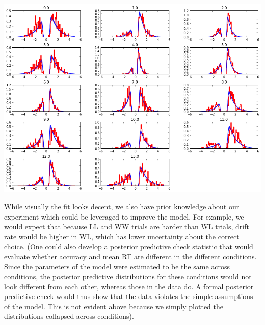 \documentclass[letterpaper,10pt,english]{sphinxmanual}
\begin{document}
\includegraphics{hddm_demo_fig_05.png}

While visually the fit looks decent, we also have prior knowledge about
our experiment which could be leveraged to improve the model. For
example, we would expect that because LL and WW trials are harder than
WL trials, drift rate would be higher in WL, which has lower uncertainty
about the correct choice. (One could also develop a posterior predictive
check statistic that would evaluate whether accuracy and mean RT are
different in the different conditions. Since the parameters of the model
were estimated to be the same across conditions, the posterior
predictive distributions for these conditions would not look different
from each other, whereas those in the data do. A formal posterior
predictive check would thus show that the data violates the simple
assumptions of the model. This is not evident above because we simply
plotted the distributions collapsed across conditions).
\end{document}
